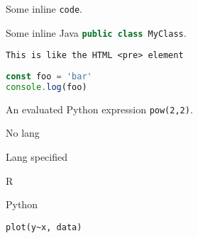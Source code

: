 %
%
%

Some inline \verb|code|.

Some inline Java \lstinline[language=Java]{public class MyClass}.

\begin{verbatim}
This is like the HTML <pre> element
\end{verbatim}

\begin{lstlisting}[language=js]
const foo = 'bar'
console.log(foo)
\end{lstlisting}


An evaluated Python expression \lstinline[language=python exec]{pow(2,2)}.


No lang 

Lang specified 

R 

Python 

\begin{lstlisting}[language=r exec]
plot(y~x, data)
\end{lstlisting}

